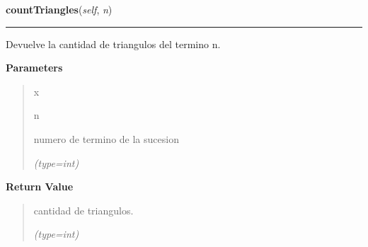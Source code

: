 \hspace{.8\funcindent}\begin{boxedminipage}{\funcwidth}

    \raggedright \textbf{countTriangles}(\textit{self}, \textit{n})

    \vspace{-1.5ex}

    \rule{\textwidth}{0.5\fboxrule}
\setlength{\parskip}{2ex}
    Devuelve la cantidad de triangulos del termino n.

\setlength{\parskip}{1ex}
      \textbf{Parameters}
      \vspace{-1ex}

      \begin{quote}
        \begin{Ventry}{x}

          \item[n]

          numero de termino de la sucesion

            {\it (type=int)}

        \end{Ventry}

      \end{quote}

      \textbf{Return Value}
    \vspace{-1ex}

      \begin{quote}
      cantidad de triangulos.

      {\it (type=int)}

      \end{quote}

    \end{boxedminipage}

    \label{FractalZE:sierpinsky:Sierpinsky:triangleArea}

    \vspace{0.5ex}

